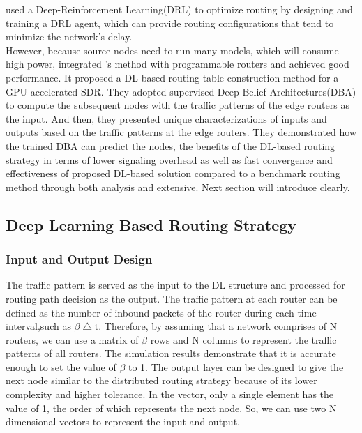 \documentclass[11pt]{report}
\begin{document}
	\noindent\cite{DBLP:journals/corr/abs-1709-07080} used a Deep-Reinforcement Learning(DRL) to optimize routing by designing and training a DRL agent, which can provide routing configurations that tend to minimize the network's delay.\\
	
	\noindent However, because source nodes need to run many models\cite{7792369}, which will consume high power, \cite{7935536} integrated \cite{7792369}'s  method with programmable routers and achieved good performance. It proposed a DL-based routing table construction method for a GPU-accelerated SDR. They adopted supervised Deep Belief Architectures(DBA) to compute the subsequent nodes with the traffic patterns of the edge routers as the input. And then, they presented unique characterizations of inputs and outputs based on the traffic patterns at the edge routers. They demonstrated how the trained DBA can predict the nodes, the benefits of the DL-based routing strategy in terms of lower signaling overhead as well as fast convergence and effectiveness of proposed DL-based solution compared to a benchmark routing method through both analysis and extensive. Next section will introduce clearly.\\
	
	\subsection{Deep Learning Based Routing Strategy}
	\subsubsection{Input and Output Design}
    The traffic pattern is served as the input to the DL structure and processed for routing path decision as the output. The traffic pattern at each router can be defined as the number of inbound packets of the router during each time interval,such as $\beta\bigtriangleup$t. Therefore, by assuming that a network comprises of N routers, we can use a matrix of $\beta$ rows and N columns to represent the traffic patterns of all routers. The simulation results demonstrate that it is accurate enough to set the value of $\beta$ to 1. The output layer can be designed to give the next node similar to the distributed routing strategy because of its lower complexity and higher tolerance. In the vector, only a single element has the value of 1, the order of which represents the next node. So, we can use two N dimensional vectors to represent the input and output.
	
\end{document}
